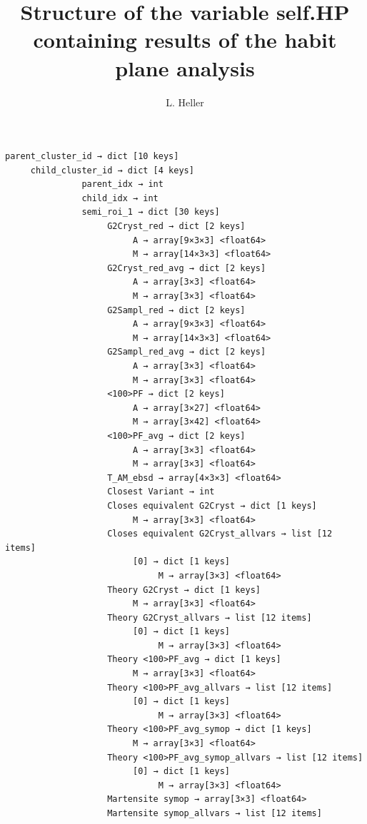 \documentclass[a4paper,10pt]{article}
\title{Structure of the variable self.HP containing results of the habit plane analysis}
\author{L. Heller}
\begin{document}
\maketitle
\begin{verbatim}
parent_cluster_id → dict [10 keys]
     child_cluster_id → dict [4 keys]
               parent_idx → int
               child_idx → int
               semi_roi_1 → dict [30 keys]
                    G2Cryst_red → dict [2 keys]
                         A → array[9×3×3] <float64>
                         M → array[14×3×3] <float64>
                    G2Cryst_red_avg → dict [2 keys]
                         A → array[3×3] <float64>
                         M → array[3×3] <float64>
                    G2Sampl_red → dict [2 keys]
                         A → array[9×3×3] <float64>
                         M → array[14×3×3] <float64>
                    G2Sampl_red_avg → dict [2 keys]
                         A → array[3×3] <float64>
                         M → array[3×3] <float64>
                    <100>PF → dict [2 keys]
                         A → array[3×27] <float64>
                         M → array[3×42] <float64>
                    <100>PF_avg → dict [2 keys]
                         A → array[3×3] <float64>
                         M → array[3×3] <float64>
                    T_AM_ebsd → array[4×3×3] <float64>
                    Closest Variant → int
                    Closes equivalent G2Cryst → dict [1 keys]
                         M → array[3×3] <float64>
                    Closes equivalent G2Cryst_allvars → list [12 items]
                         [0] → dict [1 keys]
                              M → array[3×3] <float64>
                    Theory G2Cryst → dict [1 keys]
                         M → array[3×3] <float64>
                    Theory G2Cryst_allvars → list [12 items]
                         [0] → dict [1 keys]
                              M → array[3×3] <float64>
                    Theory <100>PF_avg → dict [1 keys]
                         M → array[3×3] <float64>
                    Theory <100>PF_avg_allvars → list [12 items]
                         [0] → dict [1 keys]
                              M → array[3×3] <float64>
                    Theory <100>PF_avg_symop → dict [1 keys]
                         M → array[3×3] <float64>
                    Theory <100>PF_avg_symop_allvars → list [12 items]
                         [0] → dict [1 keys]
                              M → array[3×3] <float64>
                    Martensite symop → array[3×3] <float64>
                    Martensite symop_allvars → list [12 items]

\end{verbatim}
\end{document}
